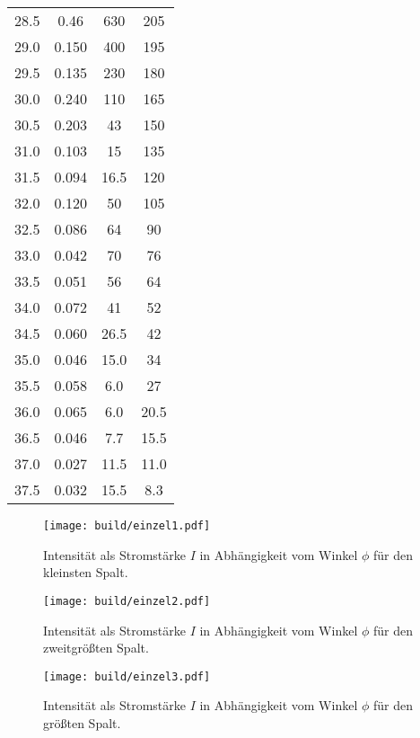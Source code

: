 \begin{table}
\begin{tabular}{c c c c}
28.5 & 0.46 & 630 & 205 \\
29.0 & 0.150 & 400 & 195 \\
29.5 & 0.135 & 230 & 180 \\
30.0 & 0.240 & 110 & 165 \\
30.5 & 0.203 & 43 & 150 \\
31.0 & 0.103 & 15 & 135 \\
31.5 & 0.094 & 16.5 & 120 \\
32.0 & 0.120 & 50 & 105 \\
32.5 & 0.086 & 64 & 90 \\
33.0 & 0.042 & 70 & 76 \\
33.5 & 0.051 & 56 & 64 \\
34.0 & 0.072 & 41 & 52 \\
34.5 & 0.060 & 26.5 & 42 \\
35.0 & 0.046 & 15.0 & 34 \\
35.5 & 0.058 & 6.0 & 27 \\
36.0 & 0.065 & 6.0  & 20.5 \\
36.5 & 0.046 & 7.7  & 15.5 \\
37.0 & 0.027 & 11.5 & 11.0 \\
37.5 & 0.032 & 15.5 & 8.3 \\
\bottomrule
\end{tabular}
\end{table}

\begin{figure}
  \centering
  \texttt{[image: build/einzel1.pdf]}
  \caption{Intensität als Stromstärke $I$ in Abhängigkeit vom Winkel $\phi$ für den kleinsten Spalt.}
  \label{fig:einzel1}
\end{figure}

\begin{figure}
  \centering
  \texttt{[image: build/einzel2.pdf]}
  \caption{Intensität als Stromstärke $I$ in Abhängigkeit vom Winkel $\phi$ für den zweitgrößten Spalt.}
  \label{fig:einzel2}
\end{figure}

\begin{figure}
  \centering
  \texttt{[image: build/einzel3.pdf]}
  \caption{Intensität als Stromstärke $I$ in Abhängigkeit vom Winkel $\phi$ für den größten Spalt.}
  \label{fig:einzel3}
\end{figure}

